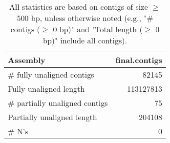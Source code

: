 \documentclass[12pt,a4paper]{article}
\begin{document}
\begin{table}[ht]
\begin{center}
\caption{All statistics are based on contigs of size $\geq$ 500 bp, unless otherwise noted (e.g., "\# contigs ($\geq$ 0 bp)" and "Total length ($\geq$ 0 bp)" include all contigs).}
\begin{tabular}{|l*{1}{|r}|}
\hline
Assembly & final.contigs \\ \hline
\# fully unaligned contigs & 82145 \\ \hline
Fully unaligned length & 113127813 \\ \hline
\# partially unaligned contigs & 75 \\ \hline
Partially unaligned length & 204108 \\ \hline
\# N's & 0 \\ \hline
\end{tabular}
\end{center}
\end{table}
\end{document}
